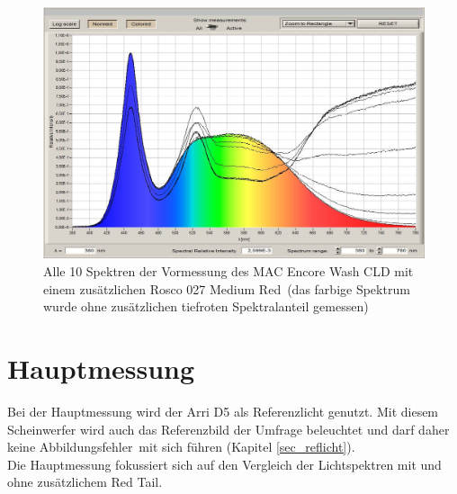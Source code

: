 \begin{figure}[H]     %
\centering
\includegraphics[width=1.0\textwidth]{bilder/encorevor1} 
\caption {Alle 10 Spektren der Vormessung des MAC Encore Wash CLD mit einem zusätzlichen  Rosco 027 \glqq Medium Red\grqq\ (das farbige Spektrum wurde ohne zusätzlichen tiefroten Spektralanteil gemessen)}\label{b_encorevor1}
\end{figure}

\section{Hauptmessung}\label{chap_hauptmessung}
Bei der Hauptmessung wird der Arri D5 als Referenzlicht genutzt. Mit diesem Scheinwerfer wird auch das Referenzbild der Umfrage beleuchtet und darf daher keine \glqq Abbildungsfehler\grqq\ mit sich führen (Kapitel \ref{sec_reflicht}).\\ Die Hauptmessung fokussiert sich auf den Vergleich der Lichtspektren mit und ohne zusätzlichem \glqq Red Tail\grqq .

\newpage
